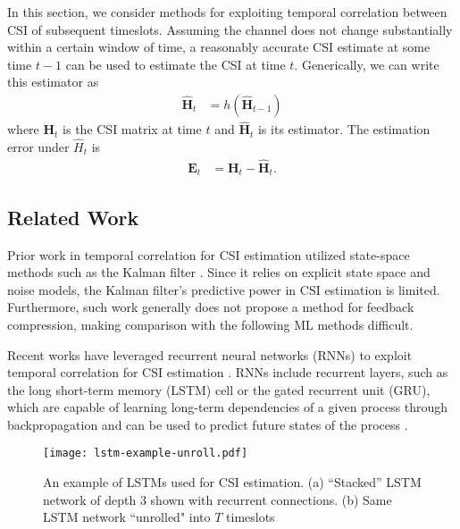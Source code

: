 In this section, we consider methods for exploiting temporal correlation between CSI of subsequent timeslots.
Assuming the channel does not change substantially within a certain window of time,
a reasonably accurate CSI estimate at some time $t-1$ can be used to estimate the CSI at time $t$.
Generically, we can write this estimator as
\begin{align}
\hat{\mathbf H}_t &= h(\hat{\mathbf H}_{t-1}) \label{eq:gen_estim}
\end{align}
where $\mathbf{H}_t$ is the CSI matrix at time $t$ and $\hat{\mathbf H}_t$ is its estimator. 
The estimation error under $\hat H_t$ is
\begin{align}
\mathbf E_{t} &= \mathbf H_{t} - \hat{\mathbf H}_{t}. \label{eq:diff_err}
\end{align}

\subsection{Related Work}

Prior work in temporal correlation for CSI estimation utilized state-space methods such as the Kalman filter \cite{ref:Huber2006improved,ref:Ali2020BayesKalmanFilter,ref:Kim2021KalmanVsML}. Since it relies on explicit state space and noise models, the Kalman filter's predictive power in CSI estimation is limited. Furthermore, such work generally does not propose a method for feedback compression, making comparison with the following ML methods difficult.

Recent works have leveraged recurrent neural networks (RNNs) to exploit temporal correlation for CSI estimation \cite{ref:Lu2019RecCsiNet, ref:Liao2019BiLSTM, ref:Li2020SpatTempLSTM,
 ref:Jang2019Delay,ref:Wang2019CsiNetLSTM}. RNNs include recurrent layers, such as the long short-term memory (LSTM) cell or the gated recurrent unit (GRU), which are capable of learning long-term dependencies of a given process through backpropagation \cite{ref:Hermans2013Training} and can be used to predict future states of the process \cite{ref:Pascanu2014HowTo}.

\begin{figure}[htb]
	\centering
	\texttt{[image: lstm-example-unroll.pdf]}
	\medskip
	\caption{An example of LSTMs used for CSI estimation. (a) ``Stacked'' LSTM network of depth 3 shown with recurrent connections. (b) Same LSTM network ``unrolled" into $T$ timeslots }
	\label{fig:lstm_example}
\end{figure}

